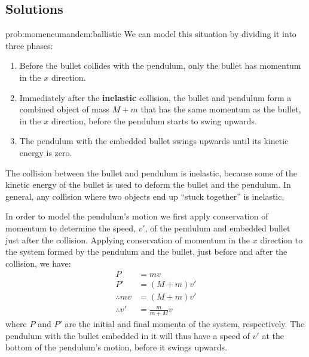 \subsection{Solutions}
\begin{solution}{prob:momencumandcm:ballistic}\label{soln:momentumandcm:ballistic}
We can model this situation by dividing it into three phases:
\begin{enumerate}
\item Before the bullet collides with the pendulum, only the bullet has momentum in the $x$ direction.
\item Immediately after the \textbf{inelastic} collision, the bullet and pendulum form a combined object of mass $M+m$ that has the same momentum as the bullet, in the $x$ direction, before the pendulum starts to swing upwards.
\item The pendulum with the embedded bullet swings upwards until its kinetic energy is zero.
\end{enumerate}
The collision between the bullet and pendulum is inelastic, because some of the kinetic energy of the bullet is used to deform the bullet and the pendulum. In general, any collision where two objects end up ``stuck together'' is inelastic.

In order to model the pendulum's motion we first apply conservation of momentum to determine the speed, $v'$, of the pendulum and embedded bullet just after the collision. Applying conservation of momentum in the $x$ direction to the system formed by the pendulum and the bullet, just before and after the collision, we have:
\begin{align*}
P &= mv\\
P' &= (M+m)v'\\
\therefore mv &= (M+m)v'\\
\therefore v' &= \frac{m}{m+M}v
\end{align*}
where $P$ and $P'$ are the initial and final momenta of the system, respectively. The pendulum with the bullet embedded in it will thus have a speed of $v'$ at the bottom of the pendulum's motion, before it swings upwards. 


\end{solution}
